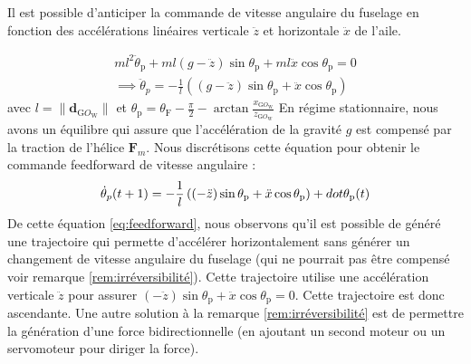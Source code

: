 {    Il est possible d'anticiper la commande de vitesse angulaire du fuselage en fonction des accélérations linéaires verticale $\ddot{z}$ et horizontale $\ddot{x}$ de l'aile.

    \begin{align}
        \label{eq:dynamiquependule}
        m l^{2} \ddot{\theta}_{\text{p}} + ml(g-\ddot{z}) \sin{\theta_{\text{p}}} + ml \ddot{x} \cos{\theta_{\text{p}}} = 0\\
        \implies \ddot{\theta}_{p} = -\frac{1}{l} \left( (g-\ddot{z})\sin{\theta_{\text{p}}} + \ddot{x} \cos{\theta_{\text{p}}} \right)
    \end{align}
    avec $l = \| \boldsymbol{d}_{\text{G}O_{\text{W}}} \|$ et $\theta_{\text{p}} = \theta_{\text{F}} - \frac{\pi}{2} - \arctan{\frac{{x}_{\text{G}O_{\text{W}}}}{{z}_{\text{G}O_{\text{W}}}}}$
    En régime stationnaire, nous avons un équilibre qui assure que l'accélération de la gravité $g$ est compensé par la traction de l'hélice $\boldsymbol{F}_{m}$. Nous discrétisons cette équation pour obtenir le commande feedforward de vitesse angulaire : 
    \begin{align}
        \label{eq:feedforward}
        \dot{\theta}_{p} (t+1) = -\frac{1}{l} \left( (-\ddot{z})\sin{\theta_{\text{\text{p}}}} + \ddot{x} \cos{\theta_{\text{p}}} \right) + dot{\theta}_{\text{p}} (t)
    \end{align}
    De cette équation \eqref{eq:feedforward}, nous observons qu'il est possible de généré une trajectoire qui permette d'accélérer horizontalement sans générer un changement de vitesse angulaire du fuselage (qui ne pourrait pas être compensé voir remarque \ref{rem:irréversibilité}). Cette trajectoire utilise une accélération verticale $\ddot{z}$ pour assurer $ (-\ddot{z})\sin{\theta_{\text{p}}} + \ddot{x} \cos{\theta_{\text{p}}} = 0 $. Cette trajectoire est donc ascendante. Une autre solution à la remarque \ref{rem:irréversibilité} est de permettre la génération d'une force bidirectionnelle (en ajoutant un second moteur ou un servomoteur pour diriger la force).



}


